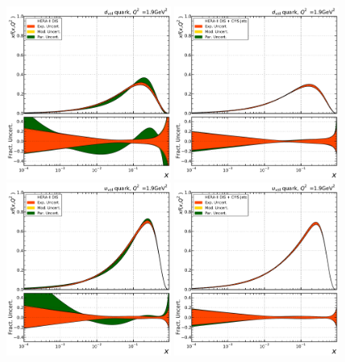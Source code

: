 \begin{figure}[tbp]
  \centering
  \includegraphics[width=0.48\textwidth]{figures/pdf_constraints/split_hera/HFTD_HERA_V017_EIG_7_1_9.pdf}\hfill%
  \includegraphics[width=0.48\textwidth]{figures/pdf_constraints/split_heracms/HFTD_HERACMSTDJETS_V017_EIG_7_1_9.pdf}
  \includegraphics[width=0.48\textwidth]{figures/pdf_constraints/split_hera/HFTD_HERA_V017_EIG_8_1_9.pdf}\hfill%
  \includegraphics[width=0.48\textwidth]{figures/pdf_constraints/split_heracms/HFTD_HERACMSTDJETS_V017_EIG_8_1_9.pdf}
  \caption{}
  \label{fig:pdfconstraints:split:dvaluval:19}
\end{figure}


